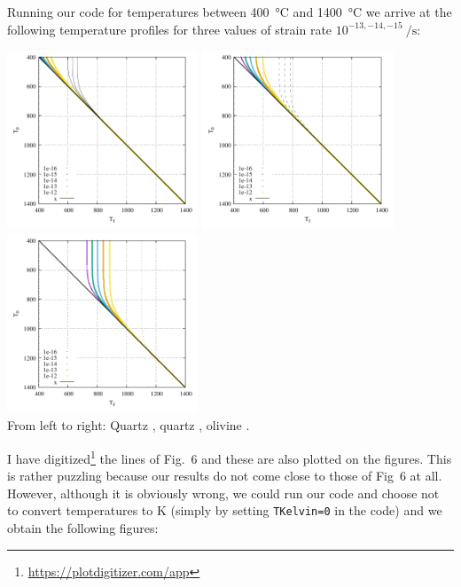Running our code for temperatures between 400~\si{\celsius} and 1400~\si{\celsius}
we arrive at the following temperature profiles for three values of strain rate 
$10^{-13,-14,-15}~\si{\per\second}$:

\begin{center}
\includegraphics[width=5.7cm]{python_codes/fieldstone_167/1kelvin/fig6.pdf}
\includegraphics[width=5.7cm]{python_codes/fieldstone_167/2kelvin/fig6.pdf}
\includegraphics[width=5.7cm]{python_codes/fieldstone_167/3kelvin/fig6.pdf}\\
{\captionfont From left to right: Quartz \cite{brko80}, quartz \cite{stsa94}, olivine \cite{brko80}.}
\end{center}

I have digitized\footnote{\url{https://plotdigitizer.com/app}} the lines of Fig.~6
and these are also plotted on the figures.
This is rather puzzling because our results do not come close to those of Fig~6 at all. 
However, although it is obviously wrong, we could run our code and choose not 
to convert temperatures to \si{\kelvin} (simply by setting \lstinline|TKelvin=0| in the code) 
and we obtain the following figures:

